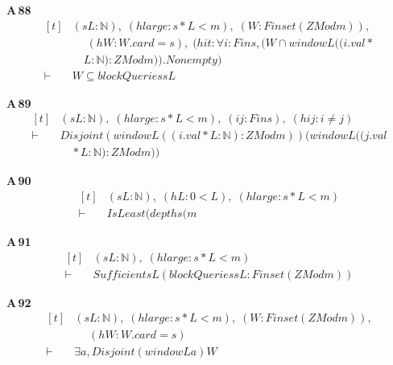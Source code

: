 \noindent\textbf{A\,88}\quad{}
{\footnotesize\[ \begin{aligned}[t]
&(\mathit{s} \mathit{L} : \mathbb{N} ),\; (\mathit{hlarge} : \mathit{s}*\mathit{L}< \mathit{m}),\; (\mathit{W} : \mathit{Finset} (\mathit{ZMod} \mathit{m})),\\
&\quad \; (\mathit{hW} : \mathit{W}.\mathit{card}=\mathit{s}),\; (\mathit{hit} : \forall \mathit{i} : \mathit{Fin} \mathit{s},(\mathit{W} \cap \mathit{window} \mathit{L} ((\mathit{i}.\mathit{val}*\\
&\quad \mathit{L} : \mathbb{N} ) : \mathit{ZMod} \mathit{m})).\mathit{Nonempty})\\
\vdash\;&\mathit{W} \subseteq \mathit{blockQueries} \mathit{s} \mathit{L}
\end{aligned} \]}

\noindent\textbf{A\,89}\quad{}
{\footnotesize\[ \begin{aligned}[t]
&(\mathit{s} \mathit{L} : \mathbb{N} ),\; (\mathit{hlarge} : \mathit{s}*\mathit{L}< \mathit{m}),\; (\mathit{i} \mathit{j} : \mathit{Fin} \mathit{s}),\; (\mathit{hij} : \mathit{i} \neq \mathit{j})\\
\vdash\;&\mathit{Disjoint} (\mathit{window} \mathit{L} ((\mathit{i}.\mathit{val}*\mathit{L} : \mathbb{N} ) : \mathit{ZMod} \mathit{m})) (\mathit{window} \mathit{L} ((\mathit{j}.\mathit{val}\\
&\quad *\mathit{L} : \mathbb{N} ) : \mathit{ZMod} \mathit{m}))
\end{aligned} \]}

\noindent\textbf{A\,90}\quad{}
{\footnotesize\[ \begin{aligned}[t]
&(\mathit{s} \mathit{L} : \mathbb{N} ),\; (\mathit{hL} : 0<\mathit{L}),\; (\mathit{hlarge} : \mathit{s}*\mathit{L}< \mathit{m})\\
\vdash\;&\mathit{IsLeast} (\mathit{depths} (\mathit{m}
\end{aligned} \]}

\noindent\textbf{A\,91}\quad{}
{\footnotesize\[ \begin{aligned}[t]
&(\mathit{s} \mathit{L} : \mathbb{N} ),\; (\mathit{hlarge} : \mathit{s}*\mathit{L}< \mathit{m})\\
\vdash\;&\mathit{Sufficient} \mathit{s} \mathit{L} (\mathit{blockQueries} \mathit{s} \mathit{L} : \mathit{Finset} (\mathit{ZMod} \mathit{m}))
\end{aligned} \]}

\noindent\textbf{A\,92}\quad{}
{\footnotesize\[ \begin{aligned}[t]
&(\mathit{s} \mathit{L} : \mathbb{N} ),\; (\mathit{hlarge} : \mathit{s}*\mathit{L}< \mathit{m}),\; (\mathit{W} : \mathit{Finset} (\mathit{ZMod} \mathit{m})),\\
&\quad \; (\mathit{hW} : \mathit{W}.\mathit{card}=\mathit{s})\\
\vdash\;&\exists \mathit{a},\mathit{Disjoint} (\mathit{window} \mathit{L} \mathit{a}) \mathit{W}
\end{aligned} \]}

